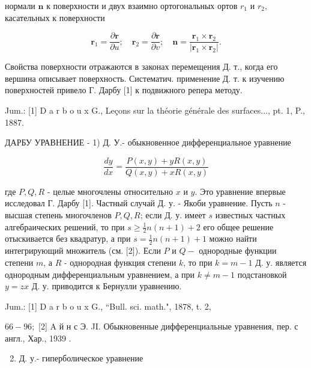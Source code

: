 \documentclass[10pt]{article}
\begin{document}
нормали $\boldsymbol{n}$ к поверхности и двух взаимно ортогональных ортов $r_{1}$ и $r_{2}$, касательных к поверхности



\[

\boldsymbol{r}_{1}=\frac{\partial \boldsymbol{r}}{\partial u} ; \quad \boldsymbol{r}_{2}=\frac{\partial \boldsymbol{r}}{\partial v} ; \quad \boldsymbol{n}=\frac{\boldsymbol{r}_{1} \times \boldsymbol{r}_{2}}{\left|\boldsymbol{r}_{1} \times \boldsymbol{r}_{2}\right|} .

\]



Свойства поверхности отражаются в законах перемещения Д. т., когда его вершина описывает поверхность. Систематич. применение Д. т. к изучению поверхностей привело Г. Дарбу [1] к подвижного репера методу.



Jum.: [1] D a r b o u x G., Leçons sur la théorie générale des surfaces..., pt. 1, P., 1887.



ДАРБУ УРАВНЕНИЕ - 1) Д. У.- обыкновенное дифференциальное уравнение



\[

\frac{d y}{d x}=\frac{P(x, y)+y R(x, y)}{Q(x, y)+x R(x, y)}

\]



где $P, Q, R$ - целые многочлены относительно $x$ и $y$. Это уравнение впервые исследовал Г. Дарбу [1]. Частный случай Д. у. - Якоби уравнение. Пусть $n$ - высшая степень многочленов $P, Q, R$; если Д. у. имеет $s$ известных частных алгебраических решений, то при $s \geqslant \frac{1}{2} n(n+1)+2$ его общее решение отыскивается без квадратур, а при $s=\frac{1}{2} n(n+1)+1$ можно найти интегрирующий множитель (см. [2]). Если $P$ и $Q-$ однородные функции степени $m$, а $R$ - однородная функция степени $k$, то при $k=m-1$ Д. у. является однородным дифференциальным уравнением, а при $k \neq m-1$ подстановкой $y=z x$ Д. у. приводится к Бернулли уравнению.



Jum.: [1] D a r b o u x G., “Bull. sci. math.", 1878, t. 2,

$66-96 ;$ [2] A й н с Э. JI. Обыкновенные дифференциальные уравнения, пер. с англ., Хар., 1939 .



\begin{enumerate}

  \setcounter{enumi}{1}

  \item Д. у.- гиперболическое уравнение

\end{enumerate}
\end{document}
